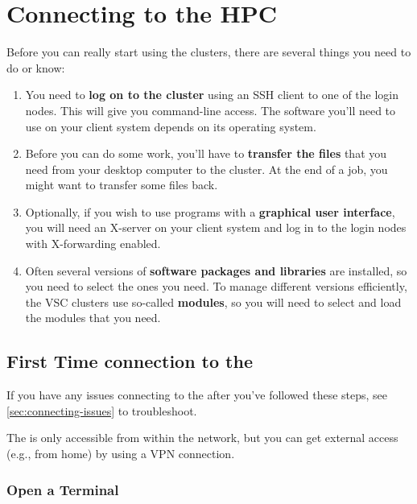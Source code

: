 \chapter{Connecting to the HPC}
\label{ch:preparing-the-environment}

Before you can really start using the \hpc clusters, there are several things you need to do or know:

\begin{enumerate}
\item  You need to \textbf{log on to the cluster} using an SSH client to one of the login nodes. This will give you command-line access. The software you'll need to use on your client system depends on its operating system.
\item  Before you can do some work, you'll have to \textbf{transfer the files} that you need from your desktop computer to the cluster. At the end of a job, you might want to transfer some files back.
\item  Optionally, if you wish to use programs with a \textbf{graphical user interface}, you will need an X-server on your client system and log in to the login nodes with X-forwarding enabled.
\item  Often several versions of \textbf{software packages and libraries} are installed, so you need to select the ones you need. To manage different versions efficiently, the VSC clusters use so-called \textbf{modules}, so you will need to select and load the modules that you need.
\end{enumerate}

\section{First Time connection to the \hpc}
\label{sec:first-time-connection-to-the-hpc}

If you have any issues connecting to the \hpc after you've followed these steps,
see \autoref{sec:connecting-issues} to troubleshoot.

\ifantwerpen
 The \hpc is only accessible from within the \university network, but you can
 get external access (e.g., from home) by using a VPN connection.
\fi

\ifwindows

  \subsection{Open a Terminal}
  \label{sec:windows-open-a-terminal}


